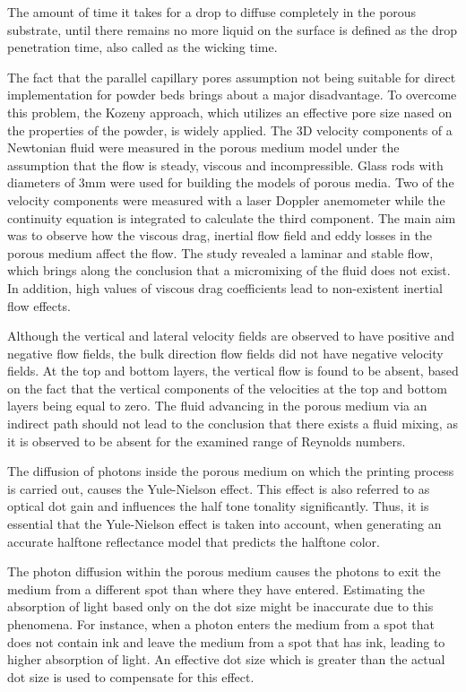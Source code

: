 The amount of time it takes for a drop to diffuse completely in the porous substrate, until there remains no more liquid on the surface is defined as the drop penetration time, also called as the wicking time.

The fact that the parallel capillary pores assumption not being suitable for direct implementation for powder beds brings about a major disadvantage. To overcome this problem, the Kozeny approach, which utilizes an effective pore size nased on the properties of the powder, is widely applied. The 3D velocity components of a Newtonian fluid were measured in the porous medium model under the assumption that the flow is steady, viscous and incompressible. Glass rods with diameters of 3mm were used for building the models of porous media. Two of the velocity components were measured with a laser Doppler anemometer while the  continuity equation is integrated to calculate the third component. The main aim was to observe how the viscous drag, inertial flow field and eddy losses in the porous medium affect the flow. The study revealed a laminar and stable  flow, which brings along the conclusion  that a micromixing of the fluid does not exist. In addition, high values of viscous drag coefficients lead to non-existent inertial flow effects.

Although the vertical and lateral velocity fields are observed  to have positive and negative  flow fields, the bulk direction flow fields did not have negative velocity fields. At the top and bottom layers, the vertical flow is found to be absent, based on the fact that the vertical components of the velocities at the top and bottom layers being equal to zero. The fluid advancing in the porous medium via an indirect path should not lead to the  conclusion that there exists a fluid mixing, as it is observed to be absent for the examined range of Reynolds numbers.\citep{hapgood2002drop}

The diffusion of photons inside the porous medium on which the printing process is carried out, causes the Yule-Nielson effect. This effect is also referred to as optical dot gain and influences the half tone tonality significantly. Thus, it is essential that the Yule-Nielson effect is taken into account, when generating an accurate halftone reflectance model that predicts the halftone color.

The photon diffusion within the porous medium causes the photons to exit the medium from a different spot than  where they  have entered. Estimating the absorption of light based only on the dot size might be inaccurate due to this phenomena. For instance, when a photon enters the medium from a spot that does  not contain ink and leave the medium from a spot that has ink, leading to higher absorption of light.
An effective dot size which is greater than the actual dot size is used to compensate for this effect.


